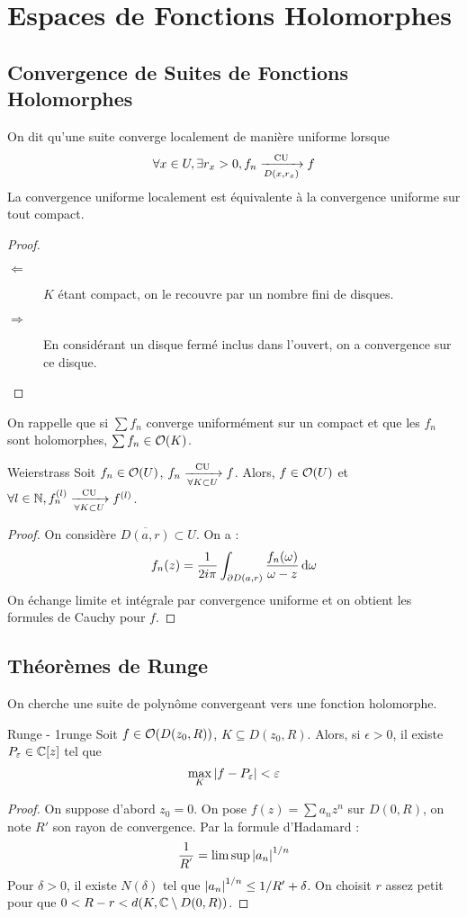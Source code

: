 \documentclass{cours}
\begin{document}
\section{Espaces de Fonctions Holomorphes}
\subsection{Convergence de Suites de Fonctions Holomorphes}
On dit qu'une suite converge localement de manière uniforme lorsque 
\[
    \forall x \in U, \exists r_{x} > 0, f_{n} \xrightarrow[D(x, r_{x})]{\rm CU} f
\]
La convergence uniforme localement est équivalente à la convergence uniforme sur tout compact.
\begin{proof}
    \begin{description}
        \item[$\Leftarrow$] $K$ étant compact, on le recouvre par un nombre fini de disques. 
        \item[$\Rightarrow$] En considérant un disque fermé inclus dans l'ouvert, on a convergence sur ce disque.   
    \end{description}
\end{proof}
On rappelle que si $\sum f_{n}$ converge uniformément sur un compact et que les $f_{n}$ sont holomorphes, $\sum f_{n} \in \mathcal{O}(K)$.

\begin{théorème}{Weierstrass}{}
    Soit $f_{n} \in \mathcal{O}(U)$, $f_{n} \xrightarrow[\forall K \subset U]{\rm CU} f$. Alors, $f \in \mathcal{O}(U)$ et $\forall l \in \mathbb{N}, f_{n}^{(l)} \xrightarrow[\forall K \subset U]{\rm CU} f^{(l)}$.
\end{théorème}
\begin{proof}
    On considère $\overline{D(a, r)}\subset U$. On a : 
    \[
        f_{n}(z) = \frac{1}{2i\pi}\int_{\partial D(a, r)}\frac{f_{n}(\omega)}{\omega - z}{\rm \, d} \omega
    \]
    On échange limite et intégrale par convergence uniforme et on obtient les formules de Cauchy pour $f$. 
\end{proof}

\subsection{Théorèmes de Runge}
On cherche une suite de polynôme convergeant vers une fonction holomorphe.
\begin{théorème}{Runge - 1}{runge}
    Soit $f \in \mathcal{O}(D(z_{0}, R))$, $K \subseteq D(z_{0}, R)$. Alors, si $\epsilon > 0$, il existe $P_{\varepsilon} \in \mathbb{C}[z]$ tel que 
    \[
       \max_{K}\left|f - P_{\varepsilon}\right| < \varepsilon
    \] 
\end{théorème}
\begin{proof}
    On suppose d'abord $z_{0} = 0$. On pose $f(z) = \sum a_{n}z^{n}$ sur $D(0, R)$, on note $R'$ son rayon de convergence. Par la formule d'Hadamard : 
    \[
        \frac{1}{R^{'}} = \limsup \left|a_{n}\right|^{1/n}
    \]
    Pour $\delta > 0$, il existe $N(\delta)$ tel que $\left|a_{n}\right|^{1/n} \leq 1/R' + \delta$. On choisit $r$ assez petit pour que $0 < R - r < d(K, \mathbb{C} \setminus D(0, R))$.
\end{proof}
\end{document}
